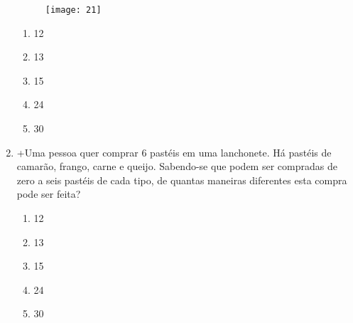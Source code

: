 \documentclass[twocolumn,oneside,a4paper,12pt]{article}
\begin{document}
\begin{enumerate}
	\begin{figure}[!tbh]
	\center
	\texttt{[image: 21]}
	\end{figure}

\begin{enumerate}
\item 12
\item 13
\item 15
\item 24
\item 30
\end{enumerate}

\item +Uma pessoa quer comprar 6 pastéis em uma lanchonete. Há pastéis de camarão, frango, carne e queijo. Sabendo-se que podem ser compradas de zero a seis pastéis de cada tipo, de quantas maneiras diferentes esta compra pode ser feita?

\begin{enumerate}
\item 12
\item 13
\item 15
\item 24
\item 30
\end{enumerate}

\end{enumerate}

\FRASE
\end{document}

